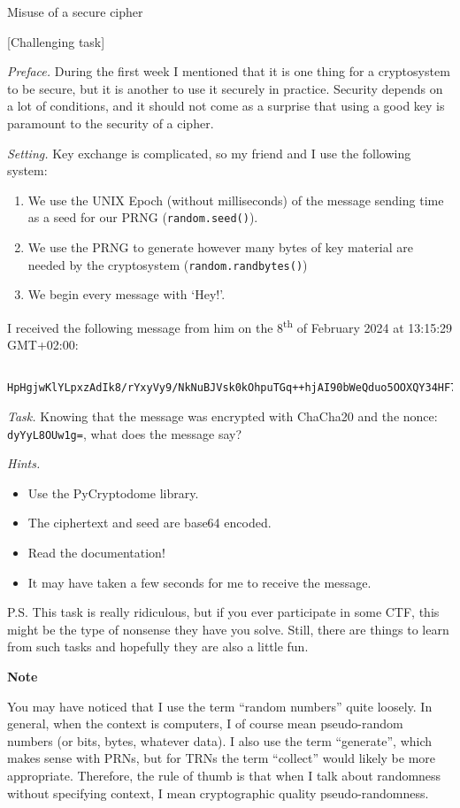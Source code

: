 \documentclass{practice}
\begin{document}
\begin{task}{Misuse of a secure cipher}

  [Challenging task]

  \textit{Preface.}
  During the first week I mentioned that it is one thing for a cryptosystem to be secure, but it is another to use it securely in practice.
  Security depends on a lot of conditions, and it should not come as a surprise that using a good key is paramount to the security of a cipher.

  \textit{Setting.}
  Key exchange is complicated, so my friend and I use the following system:
  \begin{enumerate}
    \item We use the UNIX Epoch (without milliseconds) of the message sending time as a seed for our PRNG (\texttt{random.seed()}).
    \item We use the PRNG to generate however many bytes of key material are needed by the cryptosystem (\texttt{random.randbytes()})
    \item We begin every message with `Hey!'.
  \end{enumerate}

  I received the following message from him on the 8\textsuperscript{th} of February 2024 at 13:15:29 GMT+02:00:
  \begin{lstlisting}
  HpHgjwKlYLpxzAdIk8/rYxyVy9/NkNuBJVsk0kOhpuTGq++hjAI90bWeQduo5OOXQY34HF7aOek6GgedJd2npLhhezDO29RF5zzijA==
  \end{lstlisting}

  \textit{Task.}
  Knowing that the message was encrypted with ChaCha20 and the nonce: \texttt{dyYyL8OUw1g=}, what does the message say?

  \textit{Hints.}
  \begin{itemize}
    \item Use the PyCryptodome library.
    \item The ciphertext and seed are base64 encoded.
    \item Read the documentation!
    \item It may have taken a few seconds for me to receive the message.
  \end{itemize}

  P.S. This task is really ridiculous, but if you ever participate in some CTF, this might be the type of nonsense they have you solve.
  Still, there are things to learn from such tasks and hopefully they are also a little fun.
\end{task}

\textbf{Note}

You may have noticed that I use the term \enquote{random numbers} quite loosely.
In general, when the context is computers, I of course mean pseudo-random numbers (or bits, bytes, whatever data).
I also use the term \enquote{generate}, which makes sense with PRNs, but for TRNs the term \enquote{collect} would likely be more appropriate.
Therefore, the rule of thumb is that when I talk about randomness without specifying context, I mean cryptographic quality pseudo-randomness.
\end{document}
